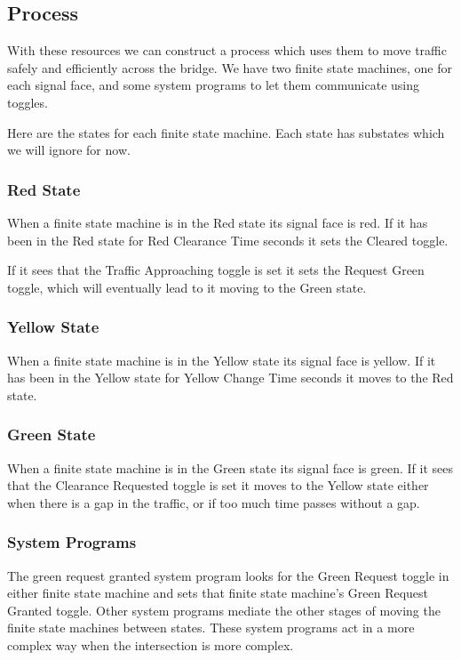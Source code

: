 \documentclass[letterpaper,twoside]{article}
\begin{document}
\subsection{Process}

With these resources we can construct a process which uses them
to move traffic safely and efficiently across the bridge.
We have two finite state machines, one for each signal face,
and some system programs to let them communicate using toggles.

Here are the states for each finite state machine.  Each state
has substates which we will ignore for now.

\subsubsection{Red State}
When a finite state machine is in the Red state its signal face is red.
If it has been in the Red state for Red Clearance Time seconds
it sets the Cleared toggle.

If it sees that the Traffic Approaching toggle is set it sets
the Request Green toggle, which will eventually lead to it moving
to the Green state.

\subsubsection{Yellow State}
When a finite state machine is in the Yellow state its signal face is yellow.
If it has been in the Yellow state for Yellow Change Time seconds it moves
to the Red state.

\subsubsection{Green State}
When a finite state machine is in the Green state its signal face is green.
If it sees that the Clearance Requested toggle is set it moves to the
Yellow state either when there is a gap in the traffic, or if too much time
passes without a gap.

\subsubsection{System Programs}

The green request granted system program looks for the Green Request
toggle in either finite state machine and sets that finite state machine's
Green Request Granted toggle.
Other system programs mediate the other stages of moving the
finite state machines between states.  These system programs act
in a more complex way when the intersection is more complex.
\end{document}
